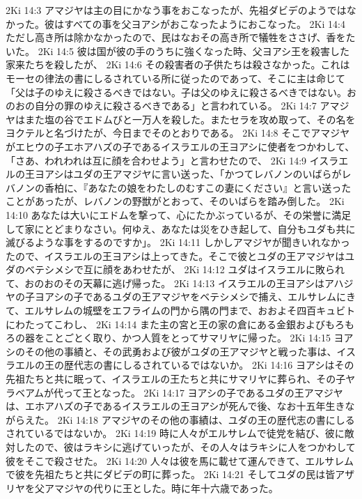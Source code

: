 2Ki 14:3  アマジヤは主の目にかなう事をおこなったが、先祖ダビデのようではなかった。彼はすべての事を父ヨアシがおこなったようにおこなった。
2Ki 14:4  ただし高き所は除かなかったので、民はなおその高き所で犠牲をささげ、香をたいた。
2Ki 14:5  彼は国が彼の手のうちに強くなった時、父ヨアシ王を殺害した家来たちを殺したが、
2Ki 14:6  その殺害者の子供たちは殺さなかった。これはモーセの律法の書にしるされている所に従ったのであって、そこに主は命じて「父は子のゆえに殺さるべきではない。子は父のゆえに殺さるべきではない。おのおの自分の罪のゆえに殺さるべきである」と言われている。
2Ki 14:7  アマジヤはまた塩の谷でエドムびと一万人を殺した。またセラを攻め取って、その名をヨクテルと名づけたが、今日までそのとおりである。
2Ki 14:8  そこでアマジヤがエヒウの子エホアハズの子であるイスラエルの王ヨアシに使者をつかわして、「さあ、われわれは互に顔を合わせよう」と言わせたので、
2Ki 14:9  イスラエルの王ヨアシはユダの王アマジヤに言い送った、「かつてレバノンのいばらがレバノンの香柏に、『あなたの娘をわたしのむすこの妻にください』と言い送ったことがあったが、レバノンの野獣がとおって、そのいばらを踏み倒した。
2Ki 14:10  あなたは大いにエドムを撃って、心にたかぶっているが、その栄誉に満足して家にとどまりなさい。何ゆえ、あなたは災をひき起して、自分もユダも共に滅びるような事をするのですか」。
2Ki 14:11  しかしアマジヤが聞きいれなかったので、イスラエルの王ヨアシは上ってきた。そこで彼とユダの王アマジヤはユダのベテシメシで互に顔をあわせたが、
2Ki 14:12  ユダはイスラエルに敗られて、おのおのその天幕に逃げ帰った。
2Ki 14:13  イスラエルの王ヨアシはアハジヤの子ヨアシの子であるユダの王アマジヤをベテシメシで捕え、エルサレムにきて、エルサレムの城壁をエフライムの門から隅の門まで、おおよそ四百キュビトにわたってこわし、
2Ki 14:14  また主の宮と王の家の倉にある金銀およびもろもろの器をことごとく取り、かつ人質をとってサマリヤに帰った。
2Ki 14:15  ヨアシのその他の事績と、その武勇および彼がユダの王アマジヤと戦った事は、イスラエルの王の歴代志の書にしるされているではないか。
2Ki 14:16  ヨアシはその先祖たちと共に眠って、イスラエルの王たちと共にサマリヤに葬られ、その子ヤラベアムが代って王となった。
2Ki 14:17  ヨアシの子であるユダの王アマジヤは、エホアハズの子であるイスラエルの王ヨアシが死んで後、なお十五年生きながらえた。
2Ki 14:18  アマジヤのその他の事績は、ユダの王の歴代志の書にしるされているではないか。
2Ki 14:19  時に人々がエルサレムで徒党を結び、彼に敵対したので、彼はラキシに逃げていったが、その人々はラキシに人をつかわして彼をそこで殺させた。
2Ki 14:20  人々は彼を馬に載せて運んできて、エルサレムで彼を先祖たちと共にダビデの町に葬った。
2Ki 14:21  そしてユダの民は皆アザリヤを父アマジヤの代りに王とした。時に年十六歳であった。
